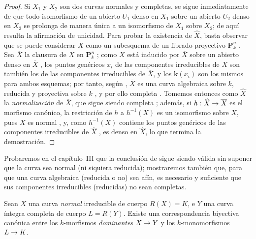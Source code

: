 \documentclass[oneside,10pt]{amsart}
\makeatletter
\newcommand{\ega@arrow}[2]{\mathchoice{#1}{#2}{#2}{#2}}
\renewcommand{\to}{\ega@arrow{\longrightarrow}{\rightarrow}}
\newcommand{\oldpage}[2][]{\marginnote{\normalfont\footnotesize\textbf{#1}~|~#2}\ignorespaces}
\let\EGAOriginalLabel\label
\renewcommand{\label}[1]{\phantomsection\EGAOriginalLabel{#1}}
\makeatother
\begin{document}
\begin{proof}
Si $X_1$ y $X_2$ son dos curvas normales y completas, se sigue inmediatamente de  que todo isomorfismo de un abierto $U_1$ denso en $X_1$ sobre un abierto $U_2$ denso en $X_2$ se prolonga de manera única a un isomorfismo de $X_1$ sobre $X_2$;
de aquí resulta la afirmación de unicidad.
Para probar la existencia de $\widehat{X}$, basta observar que se puede considerar $X$ como un subesquema de un fibrado proyectivo $\mathbf{P}_k^n$ .
Sea $\overline{X}$ la clausura de $X$ en $\mathbf{P}_k^n$ ;
como $X$ está inducido por $\overline{X}$ sobre un abierto denso en $\overline{X}$ , los puntos genéricos $x_i$ de las componentes irreducibles de $X$ son también los de las componentes irreducibles de $\overline{X}$, y los $\boldsymbol{k}(x_i)$ son los mismos para ambos esquemas; por tanto, según , $\overline{X}$ es una curva algebraica sobre $k$, reducida  y proyectiva sobre $k$ , y por ello completa .
Tomemos entonces como $\widehat{X}$ la \emph{normalización} de $\overline{X}$, que sigue siendo completa ;
además, si $h:\widehat{X}\to\overline{X}$ es el morfismo canónico, la restricción de $h$ a $h^{-1}(X)$ es un isomorfismo sobre $X$, pues $X$ es normal , y, como $h^{-1}(X)$ contiene los puntos genéricos de las componentes irreducibles de $\widehat{X}$ , es denso en $\widehat{X}$, lo que termina la demostración.
\end{proof}

\oldpage[II]{151}
\begin{remark}[7.4.12]
\label{II.7.4.12-fr}
Probaremos en el capítulo~III que la conclusión de  sigue siendo válida sin suponer que la curva sea normal (ni siquiera reducida);
mostraremos también que, para que una curva algebraica (reducida o no) sea afín, es necesario y suficiente que sus componentes irreducibles (reducidas) no sean completas.
\end{remark}

\begin{corollary}[7.4.13]
\label{II.7.4.13-fr}
Sean $X$ una curva \emph{normal} irreducible de cuerpo $R(X)=K$, e $Y$ una curva íntegra \textup{completa} de cuerpo $L=R(Y)$.
Existe una correspondencia biyectiva canónica entre los $k$-morfismos \emph{dominantes} $X\to Y$ y los $k$-monomorfismos $L\to K$.
\end{corollary}
\end{document}
